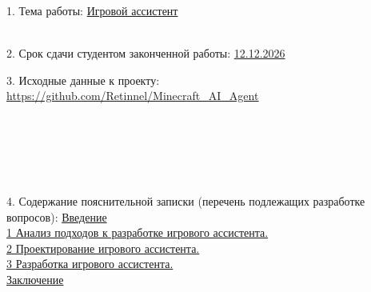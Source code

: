 {\begin{center}
  \end{center}

  1. Тема работы: \uline{Игровой ассистент}\lineunderscore\\
  \lineunderscore\\
  \vspace{1em}

  2. Срок сдачи студентом законченной работы: \uline{12.12.2026}\lineunderscore

  \vspace{1em}

  3. Исходные данные к проекту: \uline{\url{https://github.com/Retinnel/Minecraft_AI_Agent}}
  \lineunderscore\\
  \lineunderscore\\
  \lineunderscore\\
  \lineunderscore\\
  \lineunderscore\\
  \lineunderscore\\
  \lineunderscore

  \vspace{1em}

  4. Содержание пояснительной записки (перечень подлежащих разработке вопросов):
  \uline{\hspace*{2ex}Введение}\lineunderscore\\
  \uline{\hspace*{2ex}1 Анализ подходов к разработке игрового ассистента.}\lineunderscore\\
  \uline{\hspace*{2ex}2 Проектирование игрового ассистента.}\lineunderscore\\
  \uline{\hspace*{2ex}3 Разработка игрового ассистента.}\lineunderscore\\
  \uline{\hspace*{2ex}Заключение}\lineunderscore\\
  \lineunderscore\\
  \lineunderscore\\
  \lineunderscore\\
  \lineunderscore\\
  \lineunderscore\\
  \lineunderscore\\
  \lineunderscore

}

